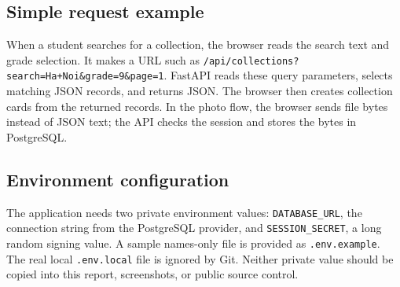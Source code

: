 \subsection{Simple request example}
When a student searches for a collection, the browser reads the search text and grade selection. It makes a URL such as \texttt{/api/collections?search=Ha+Noi\&grade=9\&page=1}. FastAPI reads these query parameters, selects matching JSON records, and returns JSON. The browser then creates collection cards from the returned records. In the photo flow, the browser sends file bytes instead of JSON text; the API checks the session and stores the bytes in PostgreSQL.

\subsection{Environment configuration}
The application needs two private environment values: \texttt{DATABASE\_URL}, the connection string from the PostgreSQL provider, and \texttt{SESSION\_SECRET}, a long random signing value. A sample names-only file is provided as \texttt{.env.example}. The real local \texttt{.env.local} file is ignored by Git. Neither private value should be copied into this report, screenshots, or public source control.
